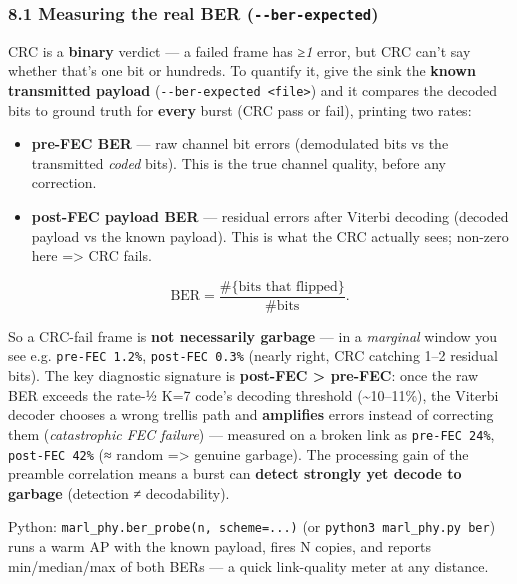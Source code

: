\documentclass[
  10pt,
]{article}
\providecommand{\tightlist}{%
  \setlength{\itemsep}{0pt}\setlength{\parskip}{0pt}}
\begin{document}
\hypertarget{81-measuring-the-real-ber---ber-expected}{%
\subsubsection{\texorpdfstring{8.1 Measuring the real BER
(\texttt{-\/-ber-expected})}{8.1 Measuring the real BER (-\/-ber-expected)}}\label{81-measuring-the-real-ber---ber-expected}}

CRC is a \textbf{binary} verdict --- a failed frame has \emph{≥1} error,
but CRC can't say whether that's one bit or hundreds. To quantify it,
give the sink the \textbf{known transmitted payload}
(\texttt{-\/-ber-expected\ \textless{}file\textgreater{}}) and it
compares the decoded bits to ground truth for \textbf{every} burst (CRC
pass or fail), printing two rates:

\begin{itemize}
\tightlist
\item
  \textbf{pre-FEC BER} --- raw channel bit errors (demodulated bits vs
  the transmitted \emph{coded} bits). This is the true channel quality,
  before any correction.
\item
  \textbf{post-FEC payload BER} --- residual errors after Viterbi
  decoding (decoded payload vs the known payload). This is what the CRC
  actually sees; non-zero here =\textgreater{} CRC fails.
\end{itemize}

\[ \text{BER} = \frac{\#\{\text{bits that flipped}\}}{\#\text{bits}}. \]

So a CRC-fail frame is \textbf{not necessarily garbage} --- in a
\emph{marginal} window you see e.g. \texttt{pre-FEC\ 1.2\%},
\texttt{post-FEC\ 0.3\%} (nearly right, CRC catching 1--2 residual
bits). The key diagnostic signature is \textbf{post-FEC \textgreater{}
pre-FEC}: once the raw BER exceeds the rate-½ K=7 code's decoding
threshold (\textasciitilde10--11\%), the Viterbi decoder chooses a wrong
trellis path and \textbf{amplifies} errors instead of correcting them
(\emph{catastrophic FEC failure}) --- measured on a broken link as
\texttt{pre-FEC\ 24\%}, \texttt{post-FEC\ 42\%} (≈ random
=\textgreater{} genuine garbage). The processing gain of the preamble
correlation means a burst can \textbf{detect strongly yet decode to
garbage} (detection ≠ decodability).

Python: \texttt{marl\_phy.ber\_probe(n,\ scheme=...)} (or
\texttt{python3\ marl\_phy.py\ ber}) runs a warm AP with the known
payload, fires N copies, and reports min/median/max of both BERs --- a
quick link-quality meter at any distance.
\end{document}
